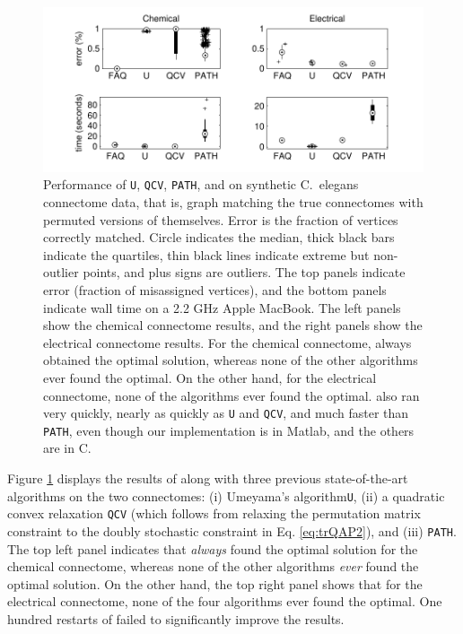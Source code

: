 \documentclass[10pt,journal,cspaper,compsoc]{IEEEtran}
\begin{document}
\begin{figure}[htbp]
	\centering
		\includegraphics[width=1.1\linewidth]{../figs/connectomes.pdf}
	\caption{Performance of \texttt{U}, \texttt{QCV}, \texttt{PATH}, and \FAQ on synthetic C.~elegans connectome data, that is, graph matching the true connectomes with permuted versions of themselves.  Error is the fraction of vertices correctly matched.  Circle indicates the median, thick black bars indicate the quartiles, thin black lines indicate extreme but non-outlier points, and plus signs are outliers. The top panels indicate error (fraction of misassigned vertices), and the bottom panels indicate wall time on a 2.2 GHz Apple MacBook.  The left panels show the chemical connectome results, and the right panels show the electrical connectome results. For the chemical connectome, \FAQ always obtained the optimal solution, whereas none of the other algorithms ever found the optimal.  On the other hand, for the electrical connectome, none of the algorithms ever found the optimal.  \FAQ also ran very quickly, nearly as quickly as \texttt{U} and \texttt{QCV}, and much faster than \texttt{PATH}, even though our \FAQ implementation is in Matlab, and the others are in C.}
	\label{fig:connectomes}
\end{figure}


Figure \ref{fig:connectomes} displays the results of \FAQ along with three previous state-of-the-art algorithms on the two connectomes: (i) Umeyama's algorithm\texttt{U}, (ii) a quadratic convex relaxation \texttt{QCV} (which follows from relaxing the permutation matrix constraint to the doubly stochastic constraint in Eq. \eqref{eq:trQAP2}), and (iii) \texttt{PATH}.  The top left panel indicates that \FAQ \emph{always} found the optimal solution for the chemical connectome, whereas none of the other algorithms \emph{ever} found the optimal solution.  On the other hand, the top right panel shows that for the electrical connectome, none of the four algorithms ever found the optimal. One hundred restarts of \FAQ failed to significantly improve the results. 
\end{document}

